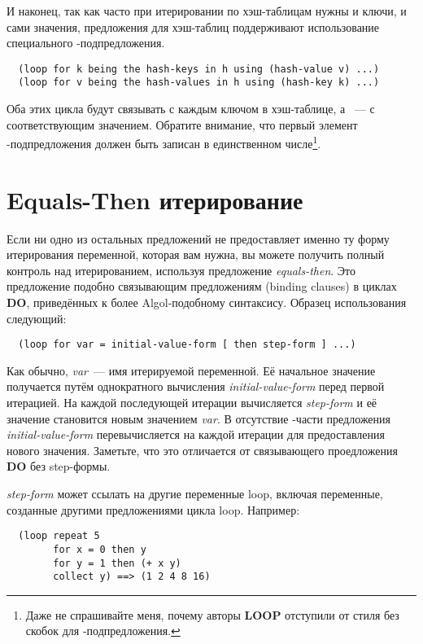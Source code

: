 И наконец, так как часто при итерировании по хэш-таблицам нужны и ключи, и сами значения,
предложения для хэш-таблиц поддерживают использование специального
-подпредложения.

\begin{lstlisting}
  (loop for k being the hash-keys in h using (hash-value v) ...)
  (loop for v being the hash-values in h using (hash-key k) ...)
\end{lstlisting}

Оба этих цикла будут связывать  с каждым ключом в хэш-таблице, а ~--- с
соответствующим значением. Обратите внимание, что первый элемент
-подпредложения должен быть записан в единственном числе\footnote{Даже не
    спрашивайте меня, почему авторы \textbf{LOOP} отступили от стиля без скобок для
    -подпредложения.}.

\section{Equals-Then итерирование}

Если ни одно из остальных предложений  не предоставляет именно ту форму
итерирования переменной, которая вам нужна, вы можете получить полный контроль над
итерированием, используя предложение \textit{equals-then}. Это предложение подобно
связывающим предложениям (binding clauses) в циклах \textbf{DO}, приведённых к более
Algol-подобному синтаксису. Образец использования следующий:

\begin{lstlisting}
  (loop for var = initial-value-form [ then step-form ] ...)
\end{lstlisting}

Как обычно, \textit{var}~--- имя итерируемой переменной. Её начальное значение получается
путём однократного вычисления \textit{initial-value-form} перед первой итерацией. На
каждой последующей итерации вычисляется \textit{step-form} и её значение становится новым
значением \textit{var}. В отсутствие -части предложения
\textit{initial-value-form} перевычисляется на каждой итерации для предоставления нового
значения. Заметьте, что это отличается от связывающего проедложения \textbf{DO} без
step-формы.

\textit{step-form} может ссылать на другие переменные loop, включая переменные, созданные
другими предложениями  цикла loop. Например:

\begin{lstlisting}
  (loop repeat 5 
        for x = 0 then y
        for y = 1 then (+ x y)
        collect y) ==> (1 2 4 8 16)
\end{lstlisting}

